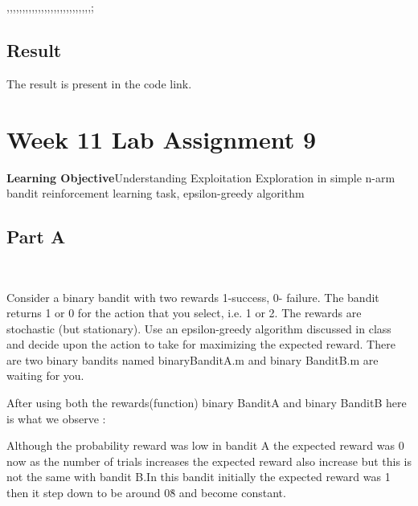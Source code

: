 ,,,,,,,,,,,,,,,,,,,,,,,,,,,;\documentclass[conference]{IEEEtran}
\begin{document}
\subsection{Result}
The result is present in the code link.
\\
\section{Week 11 Lab Assignment 9}
\textbf{Learning Objective}\:Understanding Exploitation \- Exploration in simple n-arm bandit reinforcement learning task, epsilon-greedy algorithm
\\
\subsection{Part A}
\\
\par Consider a binary bandit with two rewards 1-success, 0-
failure. The bandit returns 1 or 0 for the action that you
select, i.e. 1 or 2. The rewards are stochastic (but stationary).
Use an epsilon-greedy algorithm discussed in class and decide
upon the action to take for maximizing the expected reward.
There are two binary bandits named binaryBanditA.m and
binary BanditB.m are waiting for you.
\par After using both the rewards(function) binary BanditA and
binary BanditB here is what we observe :
\\
\par Although the probability reward was low in bandit A the expected reward 
was 0 now as the number of trials increases the expected reward also increase
but this is not the same with bandit B.In this bandit initially the expected 
reward was 1 then it step down to be around 0\.8 and become constant.
\\
\end{document}
